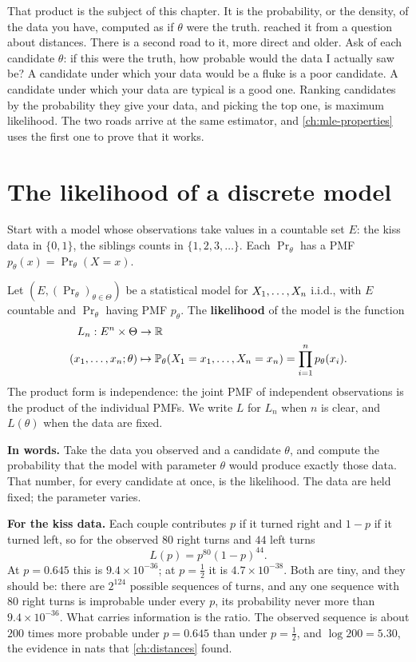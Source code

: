 That product is the subject of this chapter.
It is the probability, or the density, of the data you have, computed as if $\theta$ were the truth.
 reached it from a question about distances.
There is a second road to it, more direct and older.
Ask of each candidate $\theta$: if this were the truth, how probable would the data I actually saw be?
A candidate under which your data would be a fluke is a poor candidate.
A candidate under which your data are typical is a good one.
Ranking candidates by the probability they give your data, and picking the top one, is maximum likelihood.
The two roads arrive at the same estimator, and \cref{ch:mle-properties} uses the first one to prove that it works.

\section{The likelihood of a discrete model}
\label{sec:lik-discrete}

Start with a model whose observations take values in a countable set $E$: the kiss data in $\{0, 1\}$, the siblings counts in $\{1, 2, 3, \ldots\}$.
Each $\Pr_\theta$ has a PMF $p_\theta(x) = \Pr_\theta(X = x)$.

\begin{definition}
\label{def:likelihood-discrete}
Let $(E, (\Pr_\theta)_{\theta \in \Theta})$ be a statistical model for $X_1, \ldots, X_n$ i.i.d., with $E$ countable and $\Pr_\theta$ having PMF $p_\theta$.
The \textbf{likelihood} of the model is the function
\begin{align*}
L_n : E^n \times \Theta &\to \mathbb{R} \\
(x_1, \ldots, x_n; \theta) &\mapsto \mathbb{P}_\theta(X_1 = x_1, \ldots, X_n = x_n) = \prod_{i=1}^n p_\theta(x_i).
\end{align*}
The product form is independence: the joint PMF of independent observations is the product of the individual PMFs.
We write $L$ for $L_n$ when $n$ is clear, and $L(\theta)$ when the data are fixed.
\end{definition}

\begin{inwords}
\textbf{In words.} Take the data you observed and a candidate $\theta$, and compute the probability that the model with parameter $\theta$ would produce exactly those data. That number, for every candidate at once, is the likelihood. The data are held fixed; the parameter varies.
\par\smallskip
\textbf{For the kiss data.} Each couple contributes $p$ if it turned right and $1 - p$ if it turned left, so for the observed $80$ right turns and $44$ left turns
\[
L(p) = p^{80}(1 - p)^{44}.
\]
At $p = 0.645$ this is $9.4 \times 10^{-36}$; at $p = \frac12$ it is $4.7 \times 10^{-38}$. Both are tiny, and they should be: there are $2^{124}$ possible sequences of turns, and any one sequence with $80$ right turns is improbable under every $p$, its probability never more than $9.4 \times 10^{-36}$. What carries information is the ratio. The observed sequence is about $200$ times more probable under $p = 0.645$ than under $p = \frac12$, and $\log 200 = 5.30$, the evidence in nats that \cref{ch:distances} found.
\end{inwords}

